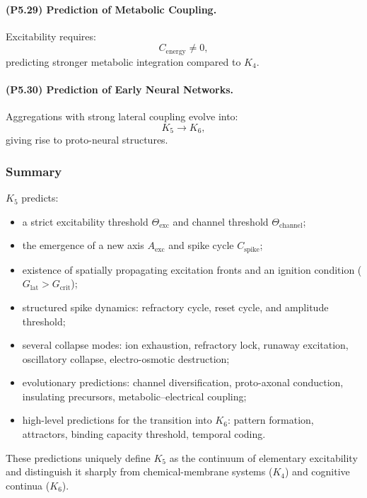 \paragraph{(P5.29) Prediction of Metabolic Coupling.}
Excitability requires:
\[
C_{\mathrm{energy}} \neq 0,
\]
predicting stronger metabolic integration compared to $K_4$.

\paragraph{(P5.30) Prediction of Early Neural Networks.}
Aggregations with strong lateral coupling evolve into:
\[
K_5 \to K_6,
\]
giving rise to proto-neural structures.

\subsubsection{Summary}

$K_5$ predicts:
\begin{itemize}
    \item a strict excitability threshold $\Theta_{\mathrm{exc}}$ and channel threshold $\Theta_{\mathrm{channel}}$;
    \item the emergence of a new axis $A_{\mathrm{exc}}$ and spike cycle $C_{\mathrm{spike}}$;
    \item existence of spatially propagating excitation fronts and an ignition condition ($G_{\mathrm{lat}} > G_{\mathrm{crit}}$);
    \item structured spike dynamics: refractory cycle, reset cycle, and amplitude threshold;
    \item several collapse modes: ion exhaustion, refractory lock, runaway excitation, oscillatory collapse, electro-osmotic destruction;
    \item evolutionary predictions: channel diversification, proto-axonal conduction, insulating precursors, metabolic–electrical coupling;
    \item high-level predictions for the transition into $K_6$: pattern formation, attractors, binding capacity threshold, temporal coding.
\end{itemize}

These predictions uniquely define $K_5$ as the continuum of elementary
excitability and distinguish it sharply from chemical-membrane systems ($K_4$)
and cognitive continua ($K_6$).
